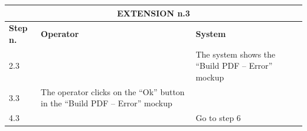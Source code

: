 {{{\begin{center}
			\begin{tabular}{|p{2cm}|p{6cm}|p{6cm}|}
			\hline
				\multicolumn{3}{|c|}{EXTENSION n.3}\\
			\hline
				\centering \vspace{1mm} \bfseries{Step n.} \vspace{1mm} & \vspace{1mm} \bfseries{Operator} \vspace{1mm} & \vspace{1mm} \bfseries{System} \vspace{1mm}\\
			\hline
				\vspace{1mm} 2.3\vspace{1mm} &
				\vspace{1mm} \vspace{1mm} & 
				\vspace{1mm} The system shows the “Build PDF – Error” mockup\vspace{1mm} \\
			\hline
				\vspace{1mm} 3.3\vspace{1mm} &
				\vspace{1mm} The operator clicks on the “Ok” button in the “Build PDF – Error” mockup\vspace{1mm} & 
				\vspace{1mm} \vspace{1mm} \\
			\hline
				\vspace{1mm} 4.3\vspace{1mm} &
				\vspace{1mm} \vspace{1mm} & 
				\vspace{1mm} Go to step 6\vspace{1mm} \\
			\hline
			\end{tabular}
			\end{center}
			
			\clearpage

}}}
